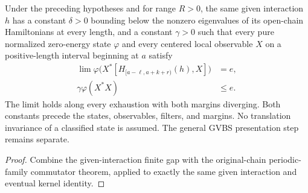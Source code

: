 \begin{lemma}
    \label{thm:periodic_family_given_interaction_finite_quasi_local_gap}
    \leanok
    Under the preceding hypotheses and for range $R>0$, the same given
    interaction $h$ has a constant $\delta>0$ bounding below the nonzero
    eigenvalues of its open-chain Hamiltonians at every length, and
    a constant $\gamma>0$ such that every pure normalized zero-energy
    state $\varphi$ and every centered local observable $X$ on a
    positive-length interval beginning at $a$ satisfy
    \begin{align}
        \lim\varphi\bigl(X^*[H_{[a-\ell,a+k+r)}(h),X]\bigr) & =e,    \\
        \gamma\varphi(X^*X)                                 & \le e.
    \end{align}
    The limit holds along every exhaustion with both margins diverging.
    Both constants precede the states, observables, filters, and margins.
    No translation invariance of a classified state is assumed. The
    general GVBS presentation step remains separate.
\end{lemma}
\begin{proof}\leanok
    Combine the given-interaction finite gap with the original-chain
    periodic-family commutator theorem, applied to exactly the same
    given interaction and eventual kernel identity.
\end{proof}
